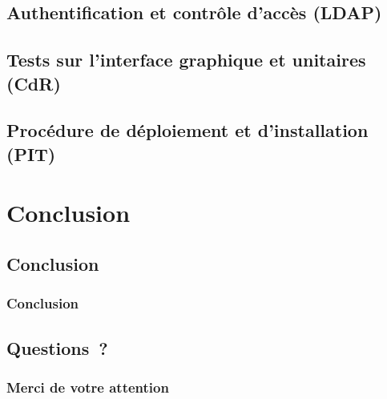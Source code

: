 \documentclass[10pt,fleqn]{beamer}
\begin{document}
\subsection[Authentification et contrôle d'accès (LDAP)]{Authentification et contrôle d'accès (LDAP)}



\subsection[Tests sur l'interface graphique et unitaires (CdR)]{Tests sur l'interface graphique et unitaires (CdR)}



\subsection[Procédure de déploiement et d'installation (PIT)]{Procédure de déploiement et d'installation (PIT)}
\begin{frame}
\end{frame}

\section[Conclusion]{Conclusion}

\subsection[Conclusion]{Conclusion}
\begin{frame}
	\frametitle{Conclusion}
\end{frame}

\subsection[Questions~?]{Questions~?}
\begin{frame}
	\frametitle{Merci de votre attention}
\end{frame}
\end{document}
